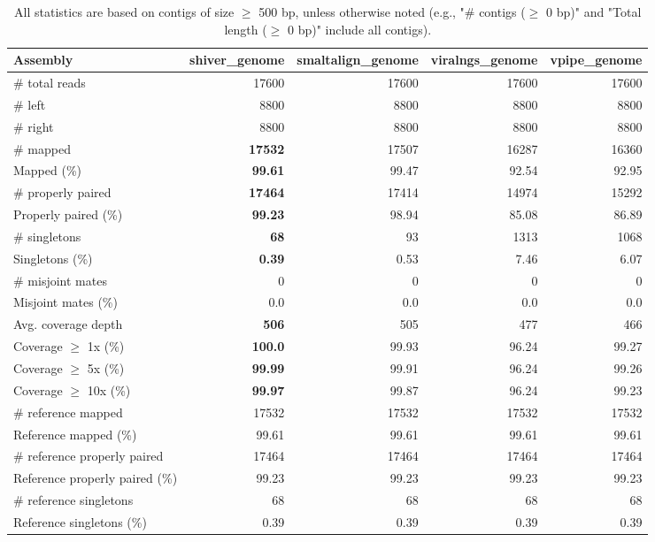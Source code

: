 \documentclass[12pt,a4paper]{article}
\begin{document}
\begin{table}[ht]
\begin{center}
\caption{All statistics are based on contigs of size $\geq$ 500 bp, unless otherwise noted (e.g., "\# contigs ($\geq$ 0 bp)" and "Total length ($\geq$ 0 bp)" include all contigs).}
\begin{tabular}{|l*{4}{|r}|}
\hline
Assembly & shiver\_genome & smaltalign\_genome & viralngs\_genome & vpipe\_genome \\ \hline
\# total reads & 17600 & 17600 & 17600 & 17600 \\ \hline
\# left & 8800 & 8800 & 8800 & 8800 \\ \hline
\# right & 8800 & 8800 & 8800 & 8800 \\ \hline
\# mapped & {\bf 17532} & 17507 & 16287 & 16360 \\ \hline
Mapped (\%) & {\bf 99.61} & 99.47 & 92.54 & 92.95 \\ \hline
\# properly paired & {\bf 17464} & 17414 & 14974 & 15292 \\ \hline
Properly paired (\%) & {\bf 99.23} & 98.94 & 85.08 & 86.89 \\ \hline
\# singletons & {\bf 68} & 93 & 1313 & 1068 \\ \hline
Singletons (\%) & {\bf 0.39} & 0.53 & 7.46 & 6.07 \\ \hline
\# misjoint mates & 0 & 0 & 0 & 0 \\ \hline
Misjoint mates (\%) & 0.0 & 0.0 & 0.0 & 0.0 \\ \hline
Avg. coverage depth & {\bf 506} & 505 & 477 & 466 \\ \hline
Coverage $\geq$ 1x (\%) & {\bf 100.0} & 99.93 & 96.24 & 99.27 \\ \hline
Coverage $\geq$ 5x (\%) & {\bf 99.99} & 99.91 & 96.24 & 99.26 \\ \hline
Coverage $\geq$ 10x (\%) & {\bf 99.97} & 99.87 & 96.24 & 99.23 \\ \hline
\# reference mapped & 17532 & 17532 & 17532 & 17532 \\ \hline
Reference mapped (\%) & 99.61 & 99.61 & 99.61 & 99.61 \\ \hline
\# reference properly paired & 17464 & 17464 & 17464 & 17464 \\ \hline
Reference properly paired (\%) & 99.23 & 99.23 & 99.23 & 99.23 \\ \hline
\# reference singletons & 68 & 68 & 68 & 68 \\ \hline
Reference singletons (\%) & 0.39 & 0.39 & 0.39 & 0.39 \\ \hline

\end{tabular}
\end{center}
\end{table}
\end{document}
